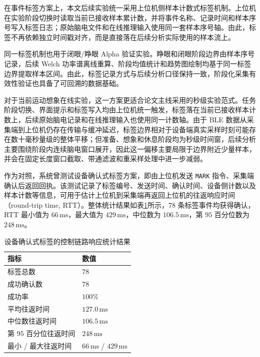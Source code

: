 在事件标签方案上，本文后续实验统一采用上位机侧样本计数式标签机制。上位机在实验阶段切换时读取当前已接收样本累计数，并将事件名称、记录时间和样本序号写入标签日志；原始脑电文件和在线推理输入使用同一套样本序号轴。由此，标签不再依赖独立时间戳对齐，而是直接落在后续分析实际使用的样本流上。

同一标签机制也用于闭眼/睁眼 Alpha 验证实验。睁眼和闭眼阶段边界由样本序号记录，后续 Welch 功率谱离线重算、阶段均值统计和趋势图绘制均基于同一标签边界提取样本区间。由此，标签记录方式与后续分析口径保持一致，阶段化采集有效性验证也具备了可回溯的数据基础。

对于当前运动想象在线实验，这一方案更适合论文主线采用的秒级实验范式。任务阶段切换、界面提示和标签写入均由上位机统一触发，标签落在当前已接收样本计数上，后续原始脑电记录和在线推理输入也使用同一计数轴。由于 BLE 数据从采集端到上位机仍存在传输与缓冲延迟，标签边界相对于设备端真实采样时刻可能存在数十毫秒量级的整体平移；但准备、想象和休息阶段均为秒级时间窗，后续分析主要围绕阶段内连续脑电窗口展开，因此这一偏移主要局限于边界附近少量样本，并会在固定长度窗口截取、带通滤波和重采样处理中进一步减弱。

作为对照，系统曾测试设备确认式标签方案，即由上位机发送 \texttt{MARK} 指令、采集端确认后返回回执。该测试记录了标签编号、发送时间、确认时间、设备侧计数以及样本计数等信息，可用于估计上位机到采集端再返回上位机的往返响应时间（round-trip time, RTT）。整体统计结果如表\ref{tab:c3_marker_overall}所示，$78$ 条标签事件均获得确认，RTT 最小值为 $66\,\mathrm{ms}$，最大值为 $429\,\mathrm{ms}$，中位数为 $106.5\,\mathrm{ms}$，第 $95$ 百分位数为 $248\,\mathrm{ms}$。

\begin{table}[htbp]
    \centering
    \caption{设备确认式标签的控制链路响应统计结果}
    \label{tab:c3_marker_overall}
    \small
    \renewcommand{\arraystretch}{1.18}
    \setlength{\tabcolsep}{6pt}
    \begin{tabular}{p{4.4cm}p{5.8cm}}
        \toprule[1.5pt]
        指标 & 数值 \\
        \midrule[1pt]
        标签总数 & $78$ \\
        成功确认数 & $78$ \\
        成功率 & $100\%$ \\
        平均往返时间 & $127.0\,\mathrm{ms}$ \\
        中位数往返时间 & $106.5\,\mathrm{ms}$ \\
        第 $95$ 百分位往返时间 & $248\,\mathrm{ms}$ \\
        最小 / 最大往返时间 & $66\,\mathrm{ms}$ / $429\,\mathrm{ms}$ \\
        \bottomrule[1.5pt]
    \end{tabular}
\end{table}

